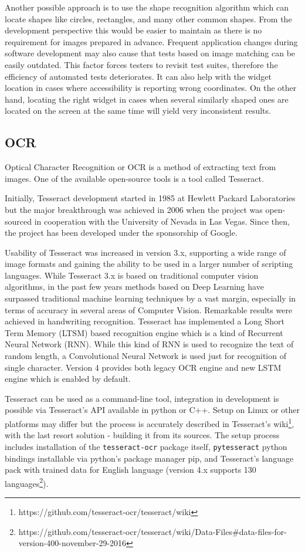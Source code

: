 Another possible approach is to use the shape recognition algorithm which can locate shapes like circles, rectangles, and many other common shapes. From the development perspective this would be easier to maintain as there is no requirement for images prepared in advance. Frequent application changes during software development may also cause that tests based on image matching can be easily outdated. This factor forces testers to revisit test suites, therefore the efficiency of automated tests deteriorates. It can also help with the widget location in cases where accessibility is reporting wrong coordinates. On the other hand, locating the right widget in cases when several similarly shaped ones are located on the screen at the same time will yield very inconsistent results.

\subsection{OCR}\label{OCR_section}
Optical Character Recognition or OCR is a method of extracting text from images. One of the available open-source tools is a tool called Tesseract.

Initially, Tesseract development started in 1985 at Hewlett Packard Laboratories but the major breakthrough was achieved in 2006 when the project was open-sourced in cooperation with the University of Nevada in Las Vegas. Since then, the project has been developed under the sponsorship of Google\cite{tesseract_history}.

Usability of Tesseract was increased in version 3.x, supporting a wide range of image formats and gaining the ability to be used in a larger number of scripting languages. While Tesseract 3.x is based on traditional computer vision algorithms, in the past few years methods based on Deep Learning have surpassed traditional machine learning techniques by a vast margin, especially in terms of accuracy in several areas of Computer Vision. Remarkable results were achieved in handwriting recognition. Tesseract has implemented a Long Short Term Memory (LTSM) based recognition engine which is a kind of Recurrent Neural Network (RNN). While this kind of RNN is used to recognize the text of random length, a Convolutional Neural Network is used just for recognition of single character. Version 4 provides both legacy OCR engine and new LSTM engine which is enabled by default.\cite{tesseract}

Tesseract can be used as a command-line tool, integration in development is possible via Tesseract's API available in python or C++. Setup on Linux or other platforms may differ but the process is accurately described in Tesseract's wiki\footnote{https://github.com/tesseract-ocr/tesseract/wiki}, with the last resort solution - building it from its sources.
The setup process includes installation of the \texttt{tesseract-ocr} package itself, \texttt{pytesseract} python bindings installable via python's package manager pip, and Tesseract's language pack with trained data for English language (version 4.x supports 130 languages\footnote{https://github.com/tesseract-ocr/tesseract/wiki/Data-Files\#data-files-for-version-400-november-29-2016}). 

